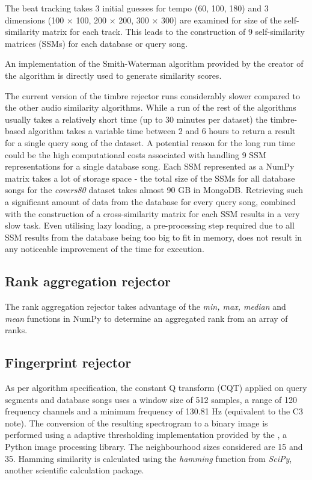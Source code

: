 The beat tracking takes 3 initial guesses for tempo (60, 100, 180) and 3
dimensions (100 $\times$ 100, 200 $\times$ 200, 300 $\times$ 300) are examined
for size of the self-similarity matrix for each track. This leads to the
construction of 9 self-similarity matrices (SSMs) for each database or query song.

An implementation of the Smith-Waterman algorithm provided by the creator of the
algorithm is directly used to generate similarity scores.

The current version of the timbre rejector runs considerably slower compared to
the other audio similarity algorithms. While a run of the rest of the algorithms
usually takes a relatively short time (up to 30 minutes per dataset) the
timbre-based algorithm takes a variable time between 2 and 6 hours to return a
result for a single query song of the dataset. A potential reason for the long
run time could be the high computational costs associated with handling 9 SSM
representations for a single database song. Each SSM represented as a NumPy
matrix takes a lot of storage space - the total size of the SSMs for all
database songs for the \textit{covers80} dataset takes almost 90 GB in MongoDB.
Retrieving such a significant amount of data from the database for every query
song, combined with the construction of a cross-similarity matrix for each SSM
results in a very slow task. Even utilising lazy loading, a pre-processing step
required due to all SSM results from the database being too big to fit in
memory, does not result in any noticeable improvement of the time for execution.



\subsection{Rank aggregation rejector}
\label{subsec:rankaggrimplementation}
The rank aggregation rejector takes advantage of the \textit{min, max, median}
and \textit{mean} functions in NumPy to determine an aggregated rank from an
array of ranks.

\subsection{Fingerprint rejector}
\label{subsec:fingerprintimplmentation}

As per algorithm specification, the constant Q transform (CQT) applied on query
segments and database songs uses a window size of 512 samples, a range of 120
frequency channels and a minimum frequency of 130.81 Hz (equivalent to the C3
note). The conversion of the resulting spectrogram to a binary image is
performed using a adaptive thresholding implementation provided by the
, a Python image processing library. The neighbourhood sizes
considered are 15 and 35. Hamming similarity is calculated using the
\textit{hamming} function from \textit{SciPy}, another scientific calculation
package. 

